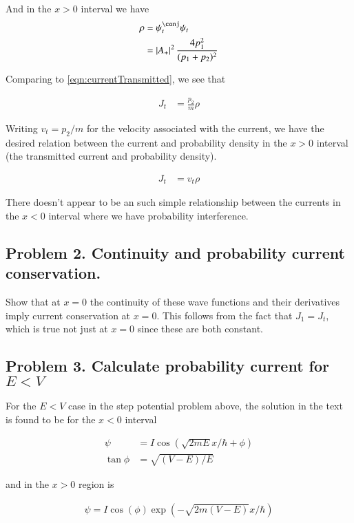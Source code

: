 \documentclass{article}
\begin{document}
And in the $x>0$ interval we have
\begin{align*}
\rho
&= \psi_t^\conj \psi_t \\
&=
\Abs{A_{+}}^2 \frac{4 p_1^2 }{(p_1 + p_2)^2}
\end{align*}

Comparing to \ref{eqn:currentTransmitted}, we see that

\begin{align*}
J_t &= \frac{ p_2 }{ m } \rho
\end{align*}

Writing $v_t = p_2/m$ for the velocity associated with the current, we have
the desired relation between the current and probability density in the $x>0$ interval (the transmitted current and probability density).

\begin{align*}
J_t &= v_t \rho
\end{align*}

There doesn't appear to be an such simple relationship between the currents
in the $x<0$ interval where we have probability interference.

\subsection{Problem 2.  Continuity and probability current conservation. }

Show that at $x=0$ the continuity of these wave functions and their derivatives 
imply current conservation at $x=0$.  This follows from the fact that $J_1 = J_t$, which is
true not just at $x=0$ since these are both constant.

\subsection{Problem 3.  Calculate probability current for $E<V$ }

For the $E<V$ case in the step potential problem above, the solution in the 
text is found to be for the $x<0$ interval

\begin{align*}
\psi &= I \cos\left( \sqrt{2mE} x/\hbar + \phi \right) \\
\tan\phi &= \sqrt{(V-E)/E}
\end{align*}

and in the $x>0$ region is

\begin{align*}
\psi = I \cos\left( \phi \right) \exp\left( -\sqrt{2m(V-E)} x/\hbar \right)
\end{align*}
\end{document}
